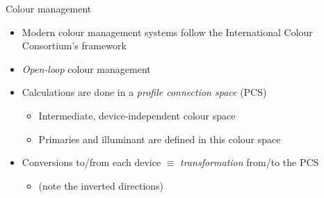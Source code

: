 \documentclass[aspectratio=169,handout,usepdftitle=false]{fireshonks}
\begin{document}
\begin{frame}{Colour management}
    \begin{itemize}
        \item Modern colour management systems follow the International Colour Consortium's framework \autocite{allen}
        \item \emph{Open-loop} colour management
        \item Calculations are done in a \emph{profile connection space} (PCS)
        \begin{itemize}
            \item Intermediate, device-independent colour space
            \item Primaries and illuminant are defined in this colour space
        \end{itemize}
        \item Conversions to/from each device $\equiv$ \emph{transformation} from/to the PCS
              \begin{itemize}
                  \item (note the inverted directions)
              \end{itemize}
    \end{itemize}
\end{frame}
\end{document}
